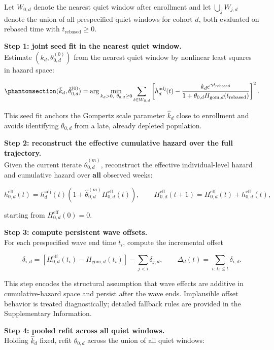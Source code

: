 \documentclass[
]{article}
\begin{document}
Let \(W_{0,d}\) denote the nearest quiet window after enrollment and let
\(\bigcup_j W_{j,d}\) denote the union of all prespecified quiet windows
for cohort \(d\), both evaluated on rebased time with
\(t_{\mathrm{rebased}} \ge 0\).

\textbf{Step 1: joint seed fit in the nearest quiet window.}\\
Estimate \((k_d,\theta_{0,d}^{(0)})\) from the nearest quiet window by
nonlinear least squares in hazard space:

\begin{equation}\protect\phantomsection\label{eq:nls-objective}{
(\hat{k}_d,\hat{\theta}_{0,d}^{(0)})
=
\arg\min_{k_d>0,\ \theta_{0,d}\ge0}
\sum_{t \in W_{0,d}}
\left[
h_d^{\mathrm{adj}}(t)-
\frac{k_d e^{\gamma t_{\mathrm{rebased}}}}{1+\theta_{0,d} H_{\mathrm{gom},d}(t_{\mathrm{rebased}})}
\right]^2 .
}\end{equation}

This seed fit anchors the Gompertz scale parameter \(\hat{k}_d\) close
to enrollment and avoids identifying \(\theta_{0,d}\) from a late,
already depleted population.

\textbf{Step 2: reconstruct the effective cumulative hazard over the
full trajectory.}\\
Given the current iterate \(\hat{\theta}_{0,d}^{(m)}\), reconstruct the
effective individual-level hazard and cumulative hazard over
\textbf{all} observed weeks:

\[
h_{0,d}^{\mathrm{eff}}(t)=h_d^{\mathrm{adj}}(t)\left(1+\hat{\theta}_{0,d}^{(m)}H_{0,d}^{\mathrm{eff}}(t)\right),
\qquad
H_{0,d}^{\mathrm{eff}}(t+1)=H_{0,d}^{\mathrm{eff}}(t)+h_{0,d}^{\mathrm{eff}}(t),
\]

starting from \(H_{0,d}^{\mathrm{eff}}(0)=0\).

\textbf{Step 3: compute persistent wave offsets.}\\
For each prespecified wave end time \(t_i\), compute the incremental
offset

\[
\delta_{i,d}
=
\left[H_{0,d}^{\mathrm{eff}}(t_i)-H_{\mathrm{gom},d}(t_i)\right]-\sum_{j<i}\delta_{j,d},
\qquad
\Delta_d(t)=\sum_{i:\,t_i\le t}\delta_{i,d}.
\]

This step encodes the structural assumption that wave effects are
additive in cumulative-hazard space and persist after the wave ends.
Implausible offset behavior is treated diagnostically; detailed fallback
rules are provided in the Supplementary Information.

\textbf{Step 4: pooled refit across all quiet windows.}\\
Holding \(\hat{k}_d\) fixed, refit \(\theta_{0,d}\) across the union of
all quiet windows:
\end{document}

